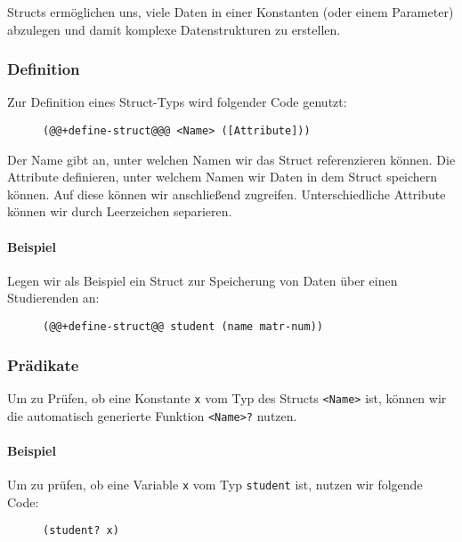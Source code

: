 	Structs ermöglichen uns, viele Daten in einer Konstanten (oder einem Parameter) abzulegen und damit komplexe Datenstrukturen zu erstellen.
	
	\subsubsection{Definition}
		Zur Definition eines Struct-Typs wird folgender Code genutzt:
		\begin{figure}[H]
			\centering
			\lstinline[language = Racket, style = base]|(@@+define-struct@@@ <Name> ([Attribute]))|
		\end{figure}
		Der Name gibt an, unter welchen Namen wir das Struct referenzieren können. Die Attribute definieren, unter welchem Namen wir Daten in dem Struct speichern können. Auf diese können wir anschließend zugreifen. Unterschiedliche Attribute können wir durch Leerzeichen separieren.
		
		\paragraph{Beispiel}
			Legen wir als Beispiel ein Struct zur Speicherung von Daten über einen Studierenden an:
			\begin{figure}[H]
				\centering
				\begin{lstlisting}[language = Racket]
(@@+define-struct@@ student (name matr-num))
\end{lstlisting}
			\end{figure}
	
	\subsubsection{Prädikate}
		Um zu Prüfen, ob eine Konstante \texttt{x} vom Typ des Structs \texttt{<Name>} ist, können wir die automatisch generierte Funktion \texttt{<Name>?} nutzen.
		
		\paragraph{Beispiel}
			Um zu prüfen, ob eine Variable \texttt{x} vom Typ \texttt{student} ist, nutzen wir folgende Code:
			\begin{figure}[H]
				\centering
				\begin{lstlisting}[language = Racket]
(student? x)
\end{lstlisting}
			\end{figure}
	
